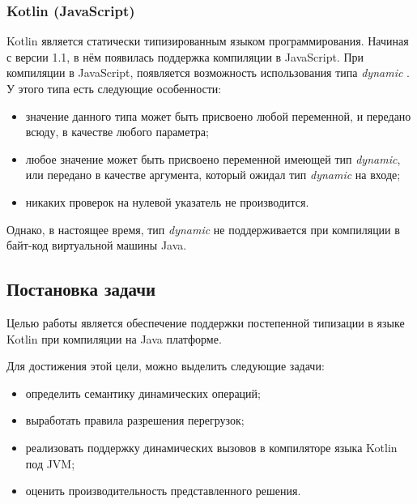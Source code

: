 \subsubsection{Kotlin (JavaScript)}
Kotlin является статически типизированным языком программирования. Начиная с версии 1.1, в нём появилась 
поддержка компиляции в JavaScript. При компиляции в JavaScript, появляется возможность использования типа \textit{dynamic} \cite{kotlin:dynamicType}. У этого типа есть следующие особенности:

\begin{itemize}
    \item значение данного типа может быть присвоено любой переменной, и передано всюду, в качестве любого параметра;
    \item любое значение может быть присвоено переменной имеющей тип \textit{dynamic}, или передано в качестве аргумента, который ожидал тип \textit{dynamic} на входе;
    \item никаких проверок на нулевой указатель не производится.
\end{itemize}

Однако, в настоящее время, тип \textit{dynamic} не поддерживается при компиляции в байт-код виртуальной машины Java.



\subsection{Постановка задачи}

Целью работы является обеспечение поддержки постепенной типизации в языке Kotlin
при компиляции на Java платформе.

Для достижения этой цели, можно выделить следующие задачи:
\begin{itemize}
    \item определить семантику динамических операций;
    \item выработать правила разрешения перегрузок;
    \item реализовать поддержку динамических вызовов в компиляторе языка Kotlin под JVM;
    \item оценить производительность представленного решения.
\end{itemize}


